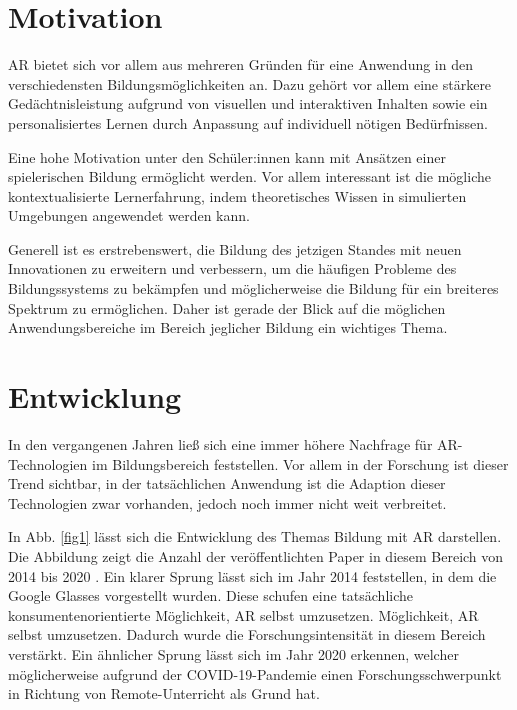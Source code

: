 \documentclass[conference]{IEEEtran}
\begin{document}
\section{Motivation}

AR bietet sich vor allem aus mehreren Gründen für eine Anwendung in den verschiedensten
Bildungsmöglichkeiten an. Dazu gehört vor allem eine stärkere Gedächtnisleistung aufgrund von
visuellen und interaktiven Inhalten sowie ein personalisiertes Lernen durch Anpassung 
auf individuell nötigen Bedürfnissen. \cite{b1} 

Eine hohe Motivation unter den Schüler:innen 
kann mit Ansätzen einer spielerischen Bildung ermöglicht werden. Vor allem interessant ist 
die mögliche kontextualisierte Lernerfahrung, indem theoretisches Wissen in simulierten 
Umgebungen angewendet werden kann. \cite{b2} 

Generell ist es erstrebenswert, die Bildung des jetzigen Standes mit neuen Innovationen zu erweitern und verbessern, 
um die häufigen Probleme des Bildungssystems zu bekämpfen und möglicherweise die Bildung für ein breiteres Spektrum zu 
ermöglichen. Daher ist gerade der Blick auf die möglichen Anwendungsbereiche im Bereich jeglicher Bildung ein wichtiges Thema.

\section{Entwicklung}
In den vergangenen Jahren ließ sich eine immer höhere Nachfrage für AR-Technologien im Bildungsbereich feststellen. Vor allem in der Forschung ist dieser Trend sichtbar, in der tatsächlichen Anwendung ist die
Adaption dieser Technologien zwar vorhanden, jedoch noch immer nicht weit verbreitet. \cite{b3}

In Abb. \ref{fig1} lässt sich die Entwicklung des Themas Bildung mit AR darstellen. Die Abbildung zeigt die Anzahl
der veröffentlichten Paper in diesem Bereich von 2014 bis 2020 \cite{w2}. Ein klarer Sprung lässt sich im Jahr 2014 feststellen,
in dem die Google Glasses vorgestellt wurden. Diese schufen eine tatsächliche konsumentenorientierte Möglichkeit, AR selbst umzusetzen. 
Möglichkeit, AR selbst umzusetzen. Dadurch wurde die Forschungsintensität in diesem Bereich verstärkt. 
Ein ähnlicher Sprung lässt sich im Jahr 2020 erkennen, welcher möglicherweise aufgrund der COVID-19-Pandemie einen Forschungsschwerpunkt in Richtung von Remote-Unterricht als Grund hat.
\end{document}
